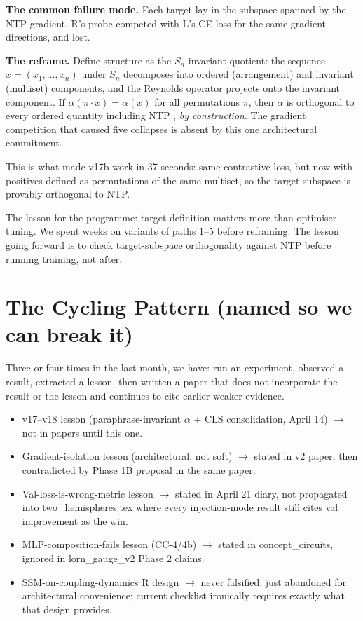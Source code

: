 \documentclass[10pt, twocolumn, a4paper]{article}
\begin{document}
\textbf{The common failure mode.} Each target lay in the subspace spanned by the NTP gradient. R's probe competed with L's CE loss for the same gradient directions, and lost.

\textbf{The reframe.} Define structure as the $S_n$-invariant quotient: the sequence $x = (x_1, \ldots, x_n)$ under $S_n$ decomposes into ordered (arrangement) and invariant (multiset) components, and the Reynolds operator projects onto the invariant component. If $\alpha(\pi \cdot x) = \alpha(x)$ for all permutations $\pi$, then $\alpha$ is orthogonal to every ordered quantity including NTP ,  \emph{by construction}. The gradient competition that caused five collapses is absent by this one architectural commitment.

This is what made v17b work in 37 seconds: same contrastive loss, but now with positives defined as permutations of the same multiset, so the target subspace is provably orthogonal to NTP.

The lesson for the programme: target definition matters more than optimiser tuning. We spent weeks on variants of paths 1--5 before reframing. The lesson going forward is to check target-subspace orthogonality against NTP before running training, not after.

\section{The Cycling Pattern (named so we can break it)}

Three or four times in the last month, we have: run an experiment, observed a result, extracted a lesson, then written a paper that does not incorporate the result or the lesson and continues to cite earlier weaker evidence.

\begin{itemize}[nosep,leftmargin=*]
\item v17--v18 lesson (paraphrase-invariant $\alpha$ + CLS consolidation, April 14) $\to$ not in papers until this one.
\item Gradient-isolation lesson (architectural, not soft) $\to$ stated in v2 paper, then contradicted by Phase 1B proposal in the same paper.
\item Val-loss-is-wrong-metric lesson $\to$ stated in April 21 diary, not propagated into two\_hemispheres.tex where every injection-mode result still cites val improvement as the win.
\item MLP-composition-fails lesson (CC-4/4b) $\to$ stated in concept\_circuits, ignored in lorn\_gauge\_v2 Phase 2 claims.
\item SSM-on-coupling-dynamics R design $\to$ never falsified, just abandoned for architectural convenience; current checklist ironically requires exactly what that design provides.
\end{itemize}
\end{document}
